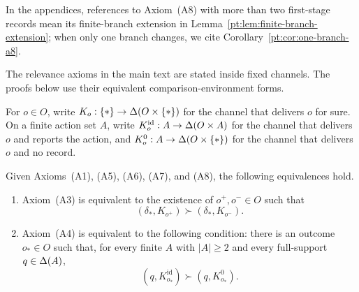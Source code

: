 In the appendices, references to Axiom~\textup{(A8)} with more than two first-stage records mean its
finite-branch extension in Lemma~\ref{pt:lem:finite-branch-extension}; when only one branch changes, we cite
Corollary~\ref{pt:cor:one-branch-a8}.

The relevance axioms in the main text are stated inside fixed channels.  The
proofs below use their equivalent comparison-environment forms.

For $o\in O$, write $K_o:\{\ast\}\to\Delta(O\times\{\ast\})$ for the channel that
delivers $o$ for sure.  On a finite action set $A$, write
$K^{\mathrm{id}}_o:A\to\Delta(O\times A)$ for the channel that delivers $o$ and
reports the action, and $K^0_o:A\to\Delta(O\times\{\ast\})$ for the channel that
delivers $o$ and no record.

\begin{lemma}\label{lem:relevance-bridge}
Given Axioms~\textup{(A1)}, \textup{(A5)}, \textup{(A6)},
\textup{(A7)}, and \textup{(A8)}, the following equivalences hold.
\begin{enumerate}[label=\textup{(\alph*)},leftmargin=*]
\item Axiom~\textup{(A3)} is equivalent to the existence of
  $o^+,o^-\in O$ such that
  \[
    (\delta_\ast,K_{o^+})\succ(\delta_\ast,K_{o^-}).
  \]
\item Axiom~\textup{(A4)} is equivalent to the following condition: there is
  an outcome $o_\ast\in O$ such that, for every finite $A$ with $|A|\ge2$
  and every full-support $q\in\Delta(A)$,
  \[
    (q,K^{\mathrm{id}}_{o_\ast})\succ(q,K^0_{o_\ast}).
  \]
\end{enumerate}
\end{lemma}

